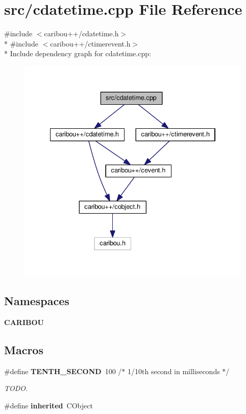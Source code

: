 \section{src/cdatetime.cpp File Reference}
\label{cdatetime_8cpp}
{\ttfamily \#include $<$caribou++/cdatetime.\-h$>$}\\*
{\ttfamily \#include $<$caribou++/ctimerevent.\-h$>$}\\*
Include dependency graph for cdatetime.\-cpp\-:\nopagebreak
\begin{figure}[H]
\begin{center}
\leavevmode
\includegraphics[width=334pt]{cdatetime_8cpp__incl}
\end{center}
\end{figure}
\subsection*{Namespaces}
\begin{DoxyCompactItemize}
\item 
{\bf C\-A\-R\-I\-B\-O\-U}
\end{DoxyCompactItemize}
\subsection*{Macros}
\begin{DoxyCompactItemize}
\item 
\#define {\bf T\-E\-N\-T\-H\-\_\-\-S\-E\-C\-O\-N\-D}~100  /$\ast$ 1/10th second in milliseconds $\ast$/
\begin{DoxyCompactList}\small\item\em T\-O\-D\-O. \end{DoxyCompactList}\item 
\#define {\bf inherited}~C\-Object
\end{DoxyCompactItemize}


